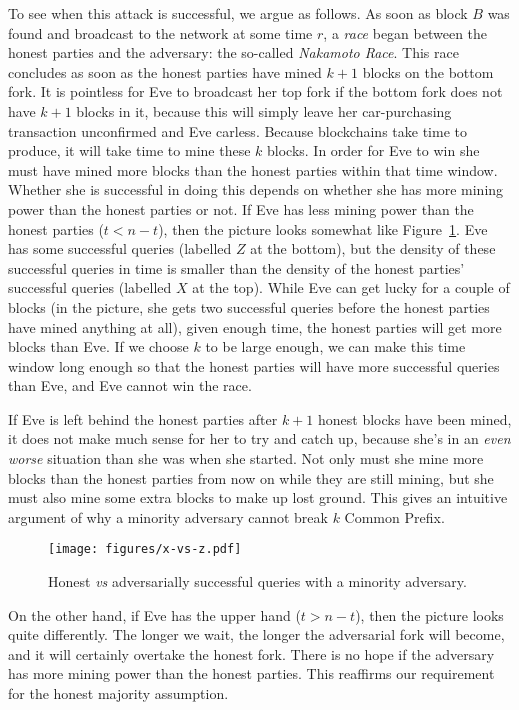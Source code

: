 To see when this attack is successful, we argue as follows. As soon as block $B$ was found and broadcast
to the network at some time $r$, a \emph{race} began between the honest parties and the adversary:
the so-called \emph{Nakamoto Race}.
This race concludes as soon as the honest parties have mined $k + 1$ blocks on the bottom fork.
It is pointless for Eve to broadcast her top fork if the bottom fork does not have $k + 1$ blocks
in it, because this will simply leave her car-purchasing transaction unconfirmed and Eve carless.
Because blockchains take time to produce, it will take time to mine these $k$ blocks. In order for
Eve to win she must have mined more blocks than the honest parties within that time window. Whether
she is successful in doing this depends on whether she has more mining power than the honest
parties or not. If Eve has less mining power than the honest parties ($t < n - t$), then the picture looks somewhat
like Figure~\ref{fig.x-vs-z}. Eve has some successful queries (labelled $Z$ at the bottom), but the density
of these successful queries in time is smaller than the density of the honest parties' successful
queries (labelled $X$ at the top). While Eve can get lucky for a couple of blocks (in the picture, she gets
two successful queries before the honest parties have mined anything at all), given enough time,
the honest parties will get more blocks than Eve. If we choose $k$ to be large enough, we can
make this time window long enough so that the honest parties will have more successful queries
than Eve, and Eve cannot win the race.

If Eve is left behind the honest parties after $k + 1$ honest blocks have been mined, it does not
make much sense for her to try and catch up, because she's in an \emph{even worse} situation than she was when
she started. Not only must she mine more blocks than the honest parties from now on while they are still
mining, but she must also mine some extra blocks to make up lost ground. This gives an intuitive
argument of why a minority adversary cannot break $k$ Common Prefix.

\begin{figure}[h]
    \centering
    \texttt{[image: figures/x-vs-z.pdf]}
    \caption{Honest \emph{vs} adversarially successful queries with a minority adversary.}
    \label{fig.x-vs-z}
\end{figure}

On the other hand, if Eve has the upper hand ($t > n - t$), then the picture looks quite differently.
The longer we wait, the longer the adversarial fork will become, and it will certainly overtake the
honest fork. There is no hope if the adversary has more mining power than the honest parties. This
reaffirms our requirement for the honest majority assumption.

